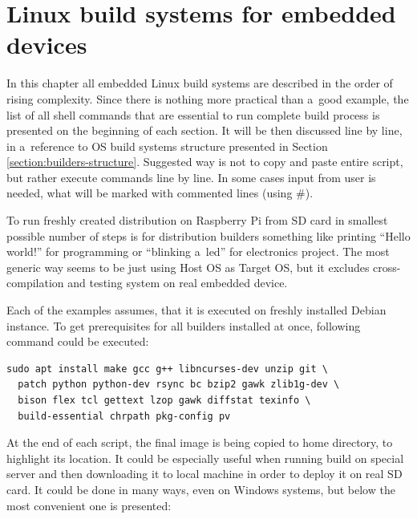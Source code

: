 \documentclass[printmode]{mgr}
\begin{document}
\chapter{Linux build systems for embedded devices}
\label{chapter:build-systems}






In this chapter all embedded Linux build systems are described in the order of rising complexity.
Since there is nothing more practical than a~good example, the list of all shell commands that are essential to run complete build process is presented on the beginning of each section.
It will be then discussed line by line, in a~reference to OS build systems structure presented in Section \ref{section:builders-structure}.
Suggested way is not to copy and paste entire script, but rather execute commands line by line.
In some cases input from user is needed, what will be marked with commented lines (using \#).

To run freshly created distribution on Raspberry Pi from SD card in smallest possible number of steps is for distribution builders something like printing ``Hello world!'' for programming or ``blinking a~led'' for electronics project.
The most generic way seems to be just using Host OS as Target OS, but it excludes cross-compilation and testing system on real embedded device.

Each of the examples assumes, that it is executed on freshly installed Debian instance.
To get prerequisites for all builders installed at once, following command could be executed:


\begin{lstlisting}
sudo apt install make gcc g++ libncurses-dev unzip git \
  patch python python-dev rsync bc bzip2 gawk zlib1g-dev \ 
  bison flex tcl gettext lzop gawk diffstat texinfo \
  build-essential chrpath pkg-config pv
\end{lstlisting}

At the end of each script, the final image is being copied to home directory, to highlight its location.
It could be especially useful when running build on special server and then downloading it to local machine in order to deploy it on real SD card.
It could be done in many ways, even on Windows systems, but below the most convenient one is presented:
\end{document}
